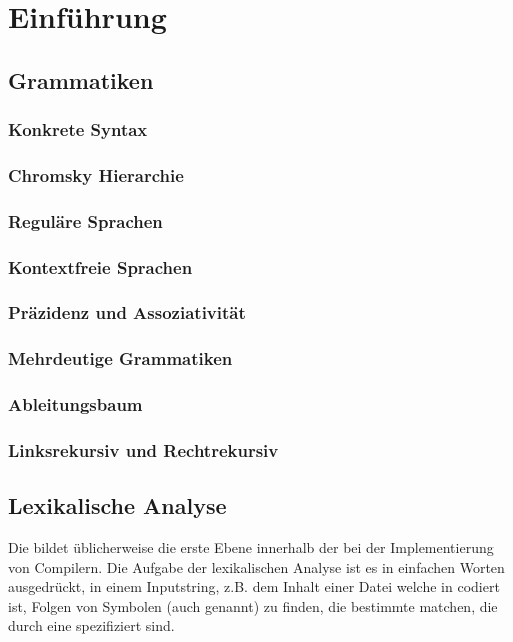 \chapter{Einführung}
\section{Grammatiken}
\subsection{Konkrete Syntax}
\subsection{Chromsky Hierarchie}
\subsection{Reguläre Sprachen}
\subsection{Kontextfreie Sprachen}
\subsection{Präzidenz und Assoziativität}
\subsection{Mehrdeutige Grammatiken}
\subsection{Ableitungsbaum}
\subsection{Linksrekursiv und Rechtrekursiv}
\section{Lexikalische Analyse}
Die  bildet üblicherweise die erste Ebene innerhalb der  bei der Implementierung von Compilern. Die Aufgabe der lexikalischen Analyse ist es in einfachen Worten ausgedrückt, in einem Inputstring, z.B. dem Inhalt einer Datei welche in  codiert ist, Folgen von Symbolen (auch  genannt) zu finden, die bestimmte  matchen, die durch eine  spezifiziert sind.

